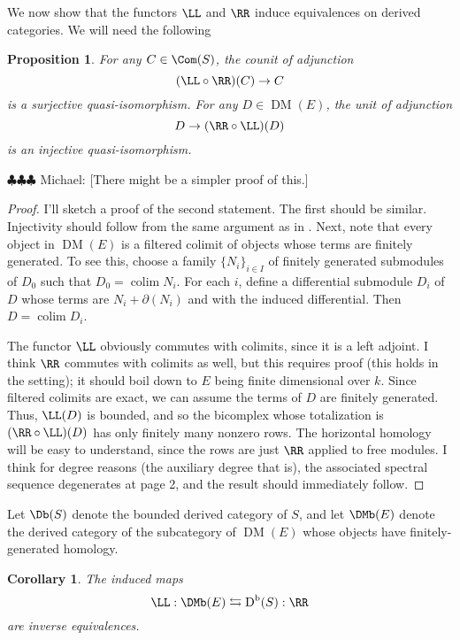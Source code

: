 \documentclass[12pt]{amsart}
\newtheorem{prop}[lemma]{Proposition}
\newtheorem{cor}[lemma]{Corollary}
\theoremstyle{definition}
\theoremstyle{remark}
\newcommand{\michael}[1]{{\color{red} \sf $\clubsuit\clubsuit\clubsuit$ Michael: [#1]}}
\def\on{\operatorname}
\def\DM{\operatorname{DM}}
\begin{document}
We now show that the functors $\LL$ and $\RR$ induce equivalences on derived categories. We will need the following
\begin{prop}
\label{resolutions}
For any $C \in \Com(S)$, the counit of adjunction
$$
(\LL \circ \RR)(C) \to C
$$
is a surjective quasi-isomorphism. For any $D \in \DM(E)$, the unit of adjunction
$$
D \to (\RR \circ \LL)(D)
$$
is an injective quasi-isomorphism.
\end{prop}

\michael{There might be a simpler proof of this.}

\begin{proof}
I'll sketch a proof of the second statement. The first should be similar. Injectivity should follow from the same argument as in \cite[Corollary 2.7]{EFS}. Next, note that every object in $\DM(E)$ is a filtered colimit of objects whose terms are finitely generated. To see this, choose a family $\{N_i\}_{i \in I}$ of finitely generated submodules of $D_0$ such that $D_0 = \on{colim} N_i$. For each $i$, define a differential submodule $D_i$ of $D$ whose terms are $N_i + \partial(N_i)$ and with the induced differential. Then $D = \on{colim} D_i$. 

The functor $\LL$ obviously commutes with colimits, since it is a left adjoint. I think $\RR$ commutes with colimits as well, but this requires proof (this holds in the \cite{EFS} setting); it should boil down to $E$ being finite dimensional over $k$. Since filtered colimits are exact, we can assume the terms of $D$ are finitely generated. Thus, $\LL(D)$ is bounded, and so the bicomplex whose totalization is $(\RR \circ \LL)(D)$ has only finitely many nonzero rows. The horizontal homology will be easy to understand, since the rows are just $\RR$ applied to free modules. I think for degree reasons (the auxiliary degree that is), the associated spectral sequence degenerates at page 2, and the result should immediately follow.

\end{proof}





Let $\Db(S)$ denote the bounded derived category of $S$, and let $\DMb(E)$ denote the derived category of the subcategory of $\DM(E)$ whose objects have finitely-generated homology.




\begin{cor}
The induced maps 
$$
\LL : \DMb(E)  \leftrightarrows \on{D}^{\on{b}}(S) : \RR
$$
are inverse equivalences.
\end{cor}
\end{document}
